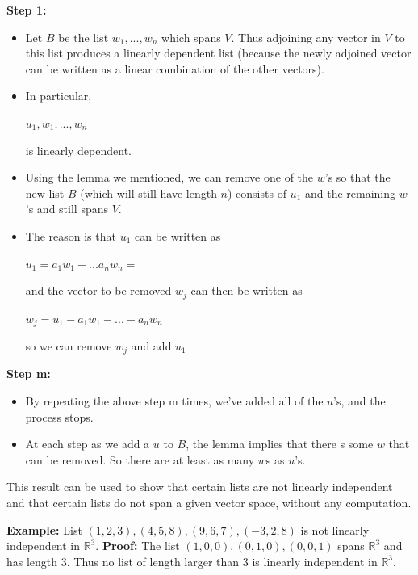 \documentclass{report}
\begin{document}
\textbf{Step 1:}\newline
\begin{itemize}
    \item Let $B$ be the list $w_1, ..., w_n$ which spans $V$. Thus adjoining any vector in $V$ to this list produces a linearly dependent list (because the newly adjoined vector can be written as a linear combination of the other vectors).
    \item In particular,\newline
        \centerline{$u_1,w_1,...,w_n$}\newline
        is linearly dependent.
    \item Using the lemma we mentioned, we can remove one of the $w$'s so that the new list $B$ (which will still have length $n$) consists of $u_1$ and the remaining $w$'s and still spans $V$.
    \item The reason is that $u_1$ can be written as\newline
            \centerline{$u_1 = a_1w_1+...a_nw_n=$}\newline
          and the vector-to-be-removed $w_j$ can then be written as\newline
            \centerline{$w_j=u_1-a_1w_1-...-a_nw_n$}\newline
          so we can remove $w_j$ and add $u_1$
\end{itemize}

\textbf{Step m:}\newline
\begin{itemize}
    \item By repeating the above step m times, we've added all of the $u$'s, and the process stops.
    \item At each step as we add a $u$ to $B$, the lemma implies that there
    s some $w$ that can be removed. So there are at least as many $w$s as $u$'s.
\end{itemize}

This result can be used to show that certain lists are not linearly independent and that certain lists do not span a given vector space, without any computation.

\textbf{Example: }\newline
List $(1,2,3),(4,5,8),(9,6,7),(-3,2,8)$ is not linearly independent in $\mathbb{R}^3$.\newline
\textbf{Proof:} The list $(1,0,0),(0,1,0),(0,0,1)$ spans $\mathbb{R}^3$ and has length 3. Thus no list of length larger than 3 is linearly independent in $\mathbb{R}^3$.\newline
\end{document}
